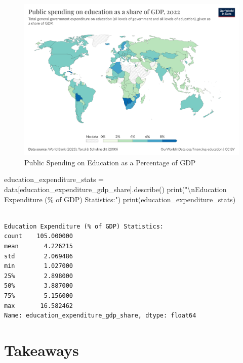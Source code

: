 \documentclass[
]{article}
\newenvironment{Shaded}{\begin{snugshade}}{\end{snugshade}}
\newcommand{\BuiltInTok}[1]{\textcolor[rgb]{0.00,0.23,0.31}{#1}}
\newcommand{\CharTok}[1]{\textcolor[rgb]{0.13,0.47,0.30}{#1}}
\newcommand{\NormalTok}[1]{\textcolor[rgb]{0.00,0.23,0.31}{#1}}
\newcommand{\OperatorTok}[1]{\textcolor[rgb]{0.37,0.37,0.37}{#1}}
\newcommand{\SpecialCharTok}[1]{\textcolor[rgb]{0.37,0.37,0.37}{#1}}
\newcommand{\StringTok}[1]{\textcolor[rgb]{0.13,0.47,0.30}{#1}}
\begin{document}
\begin{figure}[H]

{\centering \includegraphics{total-government-expenditure-on-education-gdp.png}

}

\caption{Public Spending on Education as a Percentage of GDP}

\end{figure}%

\label{education-expenditure-summary-stats}
\begin{Shaded}
\begin{Highlighting}[]
\NormalTok{education\_expenditure\_stats }\OperatorTok{=}\NormalTok{ data[}\StringTok{\textquotesingle{}education\_expenditure\_gdp\_share\textquotesingle{}}\NormalTok{].describe()}
\BuiltInTok{print}\NormalTok{(}\StringTok{"}\CharTok{\textbackslash{}n}\StringTok{Education Expenditure (}\SpecialCharTok{\% o}\StringTok{f GDP) Statistics:"}\NormalTok{)}
\BuiltInTok{print}\NormalTok{(education\_expenditure\_stats)}
\end{Highlighting}
\end{Shaded}

\begin{verbatim}

Education Expenditure (% of GDP) Statistics:
count    105.000000
mean       4.226215
std        2.069486
min        1.027000
25%        2.898000
50%        3.887000
75%        5.156000
max       16.582462
Name: education_expenditure_gdp_share, dtype: float64
\end{verbatim}

\section{Takeaways}\label{takeaways}
\end{document}
